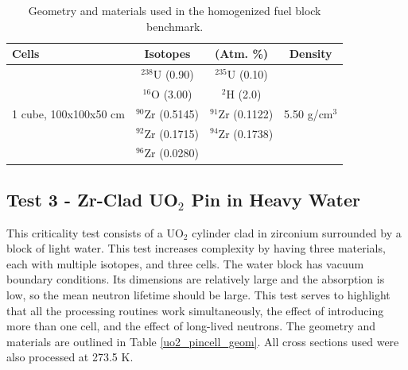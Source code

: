 \documentclass[preprint,12pt]{elsarticle}
\begin{document}
\begin{table}[h]
\centering
\caption{Geometry and materials used in the homogenized fuel block benchmark.}
\label{homfuel_geom}
\begin{tabular}{| l | c  c | c |}
\hline
Cells & Isotopes & (Atm. \%)& Density \\
\hline
\multirow{5}{*}{1 cube, 100x100x50 cm }            &   $^{238}$U   (0.90)   &  $^{235}$U   (0.10)   &  \multirow{5}{*}{5.50 g/cm$^3$} \\
                                                   &   $^{16}$O    (3.00)   &  $^{2}$H     (2.0)    &  \\
                                                   &   $^{90}$Zr   (0.5145) &  $^{91}$Zr   (0.1122) &  \\
                                                   &   $^{92}$Zr   (0.1715) &  $^{94}$Zr   (0.1738) &  \\
                                                   &   $^{96}$Zr   (0.0280) &                       &  \\
\hline
\end{tabular}
\end{table}



\subsection{Test 3 - Zr-Clad UO$_2$ Pin in Heavy Water}

This criticality test consists of a UO$_2$ cylinder clad in zirconium surrounded by a block of light water.  This test increases complexity by having three materials, each with multiple isotopes, and three cells.  The water block has vacuum boundary conditions.  Its dimensions are relatively large and the absorption is low, so the mean neutron lifetime should be large.  This test serves to highlight that all the processing routines work simultaneously, the effect of introducing more than one cell, and the effect of long-lived neutrons.  The geometry and materials are outlined in Table \ref{uo2_pincell_geom}.  All cross sections used were also processed at 273.5 K.
\end{document}
